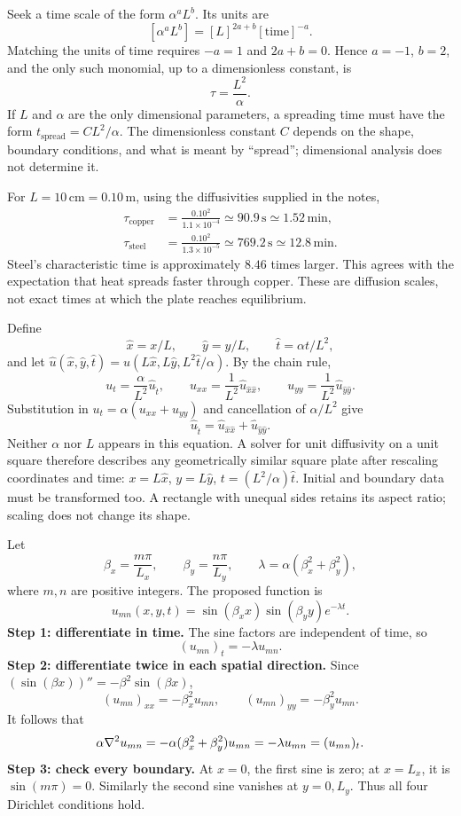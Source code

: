 Seek a time scale of the form $\alpha^a L^b$. Its units are
\[
[\alpha^aL^b]=[L]^{2a+b}[\mathrm{time}]^{-a}.
\]
Matching the units of time requires $-a=1$ and $2a+b=0$.
Hence $a=-1$, $b=2$, and the only such monomial, up to a dimensionless constant, is
\[
\boxed{\tau=\frac{L^2}{\alpha}.}
\]
If $L$ and $\alpha$ are the only dimensional parameters, a spreading time must have the form
$t_{\mathrm{spread}}=C L^2/\alpha$. The dimensionless constant $C$ depends on the shape,
boundary conditions, and what is meant by ``spread''; dimensional analysis does not determine it.

For $L=10\,\mathrm{cm}=0.10\,\mathrm{m}$, using the diffusivities supplied in the notes,
\begin{align*}
\tau_{\mathrm{copper}}&=\frac{0.10^2}{1.1\times10^{-4}}
\simeq90.9\,\mathrm{s}\simeq1.52\,\mathrm{min},\\
\tau_{\mathrm{steel}}&=\frac{0.10^2}{1.3\times10^{-5}}
\simeq769.2\,\mathrm{s}\simeq12.8\,\mathrm{min}.
\end{align*}
Steel's characteristic time is approximately $8.46$ times larger. This agrees with the
expectation that heat spreads faster through copper. These are diffusion scales, not exact
times at which the plate reaches equilibrium.

Define
\[
\hat x=x/L,\qquad \hat y=y/L,\qquad \hat t=\alpha t/L^2,
\]
and let $\hat u(\hat x,\hat y,\hat t)=u(L\hat x,L\hat y,L^2\hat t/\alpha)$.
By the chain rule,
\[
u_t=\frac{\alpha}{L^2}\hat u_{\hat t},\qquad
u_{xx}=\frac{1}{L^2}\hat u_{\hat x\hat x},\qquad
u_{yy}=\frac{1}{L^2}\hat u_{\hat y\hat y}.
\]
Substitution in $u_t=\alpha(u_{xx}+u_{yy})$ and cancellation of $\alpha/L^2$ give
\[
\boxed{\hat u_{\hat t}=\hat u_{\hat x\hat x}+\hat u_{\hat y\hat y}.}
\]
Neither $\alpha$ nor $L$ appears in this equation. A solver for unit diffusivity on a unit square
therefore describes any geometrically similar square plate after rescaling coordinates and time:
$x=L\hat x$, $y=L\hat y$, $t=(L^2/\alpha)\hat t$. Initial and boundary data must be transformed
too. A rectangle with unequal sides retains its aspect ratio; scaling does not change its shape.

Let
\[
\beta_x=\frac{m\pi}{L_x},\qquad \beta_y=\frac{n\pi}{L_y},\qquad
\lambda=\alpha(\beta_x^2+\beta_y^2),
\]
where $m,n$ are positive integers. The proposed function is
\[
u_{mn}(x,y,t)=\sin(\beta_xx)\sin(\beta_yy)e^{-\lambda t}.
\]
\textbf{Step 1: differentiate in time.}
The sine factors are independent of time, so
\[
(u_{mn})_t=-\lambda u_{mn}.
\]
\textbf{Step 2: differentiate twice in each spatial direction.}
Since $(\sin(\beta x))''=-\beta^2\sin(\beta x)$,
\[
(u_{mn})_{xx}=-\beta_x^2u_{mn},\qquad
(u_{mn})_{yy}=-\beta_y^2u_{mn}.
\]
It follows that
\[
\alpha\nabla^2 u_{mn}
=-\alpha(\beta_x^2+\beta_y^2)u_{mn}
=-\lambda u_{mn}=(u_{mn})_t.
\]
\textbf{Step 3: check every boundary.}
At $x=0$, the first sine is zero; at $x=L_x$, it is $\sin(m\pi)=0$.
Similarly the second sine vanishes at $y=0,L_y$. Thus all four Dirichlet conditions hold.

